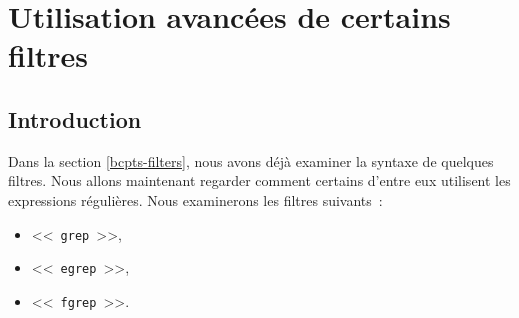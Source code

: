 %
%

\setcounter{remarque-cnt}{1}
\setcounter{example-cnt}{1}
\chapter{\label{adv-filters}Utilisation avanc{\'e}es de certains filtres}
\thispagestyle{fancy}

\section{Introduction}

Dans la section \ref{bcpts-filters}, nous avons d{\'e}j{\`a} examiner la
syntaxe de quelques filtres. Nous allons maintenant regarder comment
certains d'entre eux utilisent les expressions r{\'e}guli{\`e}res. Nous
examinerons les filtres suivants~:
\begin{itemize}
	\item	<<~{\tt grep}~>>,
	\item	<<~{\tt egrep}~>>,
	\item	<<~{\tt fgrep}~>>.
\end{itemize}

